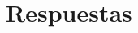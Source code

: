 \documentclass[a4paper,11pt]{article}
\newcounter{question}
\newif\ifinchoices
\newenvironment{questions}{%
  \list{\thequestion.}%
  {%
    \usecounter{question}%
    \def\question{\inchoicesfalse\item}%
    \settowidth{\leftmargin}{10.\hskip\labelsep}%
    \labelwidth\leftmargin\advance\labelwidth-\labelsep
  }%
}
{%
  \endlist
}%
\newcounter{choice}
\renewcommand\thechoice{\Alph{choice}}
\newcommand\choicelabel{\thechoice.}
\def\choice{%
  \ifinchoices
  \else
    \startchoices
  \fi
  \refstepcounter{choice}%
  \ifnum\value{choice}>1\relax
  \penalty -50\hskip 1em plus 1em\relax
  \fi
  \choicelabel
  \nobreak\enskip
}%
\def\CorrectChoice{%
  \choice
  \addanswer{\thequestion}{\thechoice}%
}
\let\correctchoice\CorrectChoice
\newcommand{\startchoices}{%
  \inchoicestrue
  \setcounter{choice}{0}%
  \par %
  \ifvmode\else\enskip\fi
}%
\newcommand{\addanswer}[2]{%
  \global\setbox\allanswers=\hbox{\unhbox\allanswers #1.~#2\quad}%
}
\newcommand{\showanswers}{%
   \noindent\unhbox\allanswers
}
\begin{document}
\section {Respuestas}
\showanswers
% 
% 
% 
\end{document}
